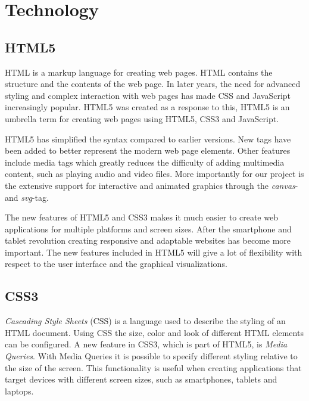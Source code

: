 \chapter{Technology} %

\label{Chapter2} %


\section{HTML5}
HTML is a markup language for creating web pages. HTML contains the structure and the contents of the web page. In later years, the need for advanced styling and complex interaction with web pages has made CSS and JavaScript increasingly popular. HTML5 was created as a response to this, HTML5 is an umbrella term for creating web pages using HTML5, CSS3 and JavaScript.

HTML5 has simplified the syntax compared to earlier versions. New tags have been added to better represent the modern web page elements. Other features include media tags which greatly reduces the difficulty of adding multimedia content, such as playing audio and video files. More importantly for our project is the extensive support for interactive and animated graphics through the \emph{canvas}- and \emph{svg}-tag.

The new features of HTML5 and CSS3 makes it much easier to create web applications for multiple platforms and screen sizes. After the smartphone and tablet revolution creating responsive and adaptable websites has become more important. The new features included in HTML5 will give a lot of flexibility with respect to the user interface and the graphical visualizations.

\section{CSS3}
\emph{Cascading Style Sheets} (CSS) is a language used to describe the styling of an HTML document. Using CSS the size, color and look of different HTML elements can be configured. A new feature in CSS3, which is part of HTML5, is \emph{Media Queries}. With Media Queries it is possible to specify different styling relative to the size of the screen. This functionality is useful when creating applications that target devices with different screen sizes, such as smartphones, tablets and laptops. 

